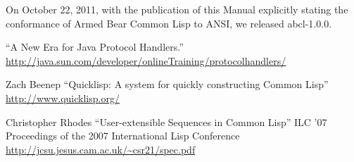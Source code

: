 \documentclass[10pt]{book}
\begin{document}
On October 22, 2011, with the publication of this Manual explicitly
stating the conformance of Armed Bear Common Lisp to \textsc{ANSI}, we released
abcl-1.0.0.



\begin{thebibliography}{9}

  ``A New Era for Java Protocol Handlers.''
  \url{http://java.sun.com/developer/onlineTraining/protocolhandlers/}

  Zach Beenep
  ``Quicklisp:  A system for quickly constructing Common Lisp''
  \url{http://www.quicklisp.org/}

Christopher Rhodes
``User-extensible Sequences in Common Lisp''
ILC '07 Proceedings of the 2007 International Lisp Conference
\url{http://jcsu.jesus.cam.ac.uk/~csr21/spec.pdf}

\end{thebibliography}
\end{document}
